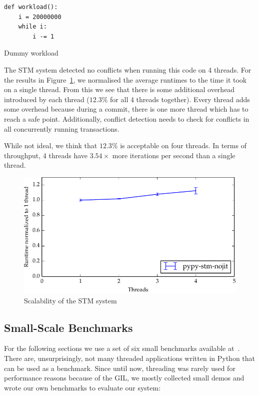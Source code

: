 \documentclass{sigplanconf}
\begin{document}
\begin{code}[h]
\begin{lstlisting}
def workload():
    i = 20000000
    while i:
        i -= 1
\end{lstlisting}
\caption{Dummy workload\label{lst:scaling_workload}}
\end{code}

The STM system detected no conflicts when running this code on 4
threads. For the results in Figure~\ref{fig:scaling}, we
normalised the average runtimes to the time it took on a single
thread. From this we see that there is some additional overhead introduced
by each thread ($12.3\%$ for all 4 threads together). Every thread
adds some overhead because during a commit, there is one more thread
which has to reach a safe point. Additionally, conflict detection
needs to check for conflicts in all concurrently running transactions.

While not ideal, we think that $12.3\%$ is acceptable on four
threads. In terms of throughput, 4 threads have $3.54\times$
more iterations per second than a single thread.

\begin{figure}[h]
  \centering
  \includegraphics[width=1\columnwidth]{plots/scaling.pdf}
  \caption{Scalability of the STM system\label{fig:scaling}}
\end{figure}


\subsection{Small-Scale Benchmarks\label{sec:performance-bench}}

For the following sections we use a set of six small benchmarks
available at~\cite{pypybenchs}. There are, unsurprisingly, not
many threaded applications written in Python that can be used
as a benchmark. Since until now, threading was rarely used
for performance reasons because of the GIL, we mostly collected
small demos and wrote our own benchmarks to evaluate our system:
\end{document}
